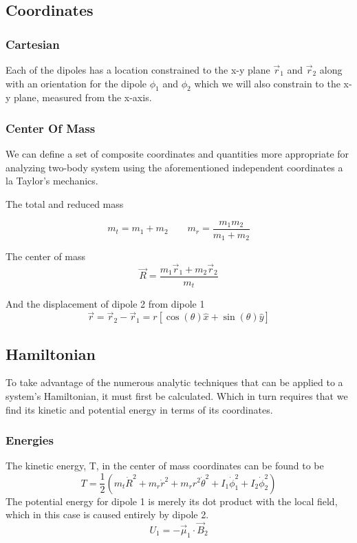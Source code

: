 \documentclass[prb,preprint]{revtex4-1}
\begin{document}
\subsection{Coordinates}
\subsubsection{Cartesian}

Each of the dipoles has a location constrained to the x-y plane $\vec r_1$ and $\vec r_2$ along with an orientation for the dipole $\phi_1$ and $\phi_2$ which we will also constrain to the x-y plane, measured from the x-axis.
\subsubsection{Center Of Mass}
We can define a set of composite coordinates and quantities more appropriate for analyzing two-body system using the aforementioned independent coordinates a la Taylor's mechanics. 

The total and reduced mass

\begin{equation}
m_t = m_1+m_2
\qquad
m_r = \frac{m_1m_2}{m_1+m_2}
\end{equation}

The center of mass 
\begin{equation}
\vec R = \frac{m_1 \vec r_1+m_2 \vec r_2}{m_t}
\end{equation}

And the displacement of dipole 2 from dipole 1
\begin{equation}
\vec r 
=  \vec r_2-\vec r_1 
= r [\cos(\theta) \hat x+\sin(\theta) \hat y]
\end{equation}


\subsection{Hamiltonian}
To take advantage of the numerous analytic techniques that can be applied to a system's Hamiltonian, it must first be calculated. Which in turn requires that we find its kinetic and potential energy in terms of its coordinates.
\subsubsection{Energies}
The kinetic energy, T, in the center of mass coordinates can be found to be
\begin{equation}
T = \frac{1}{2}(
	m_t \dot R^2
	+m_r \dot r^2
	+m_r r^2 \dot \theta^2
	+ I_1 \dot \phi_1^2
	+ I_2 \dot \phi_2^2
)
\end{equation}
The potential energy for dipole 1 is merely its dot product with the local field, which in this case is caused entirely by dipole 2.
\begin{equation}
U_1 = -\vec \mu_1 \cdot \vec B_2
\end{equation}
\end{document}
